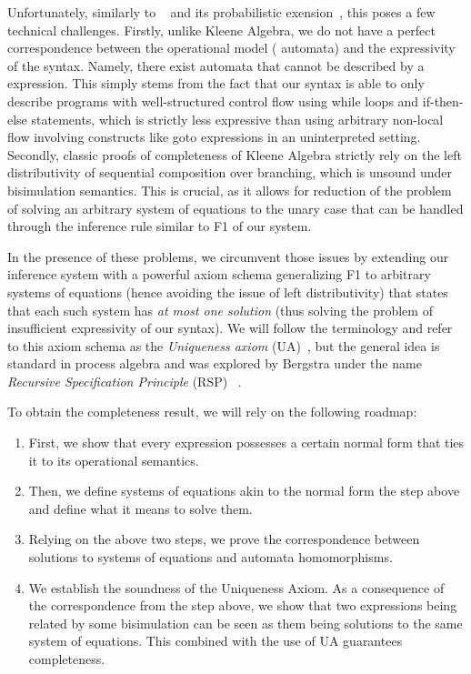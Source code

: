 \documentclass[a4paper,UKenglish,cleveref, autoref, thm-restate]{lipics-v2021}
\newcommand{\wgkat}{\textsf{\upshape{wGKAT}}\xspace}
\newcommand{\gkat}{\textsf{\upshape{GKAT}}\xspace}
\theoremstyle{plain}\newtheoremrep{thm}{Theorem}[section]
\begin{document}
	Unfortunately, similarly to \gkat~\cite{Smolka_2019} and its probabilistic exension~\cite{rozowski2023probabilistic}, this poses a few technical challenges. Firstly, unlike Kleene Algebra, we do not have a perfect correspondence between the operational model (\wgkat automata) and the expressivity of the syntax. Namely, there exist \wgkat automata that cannot be described by a \wgkat expression. This simply stems from the fact that our syntax is able to only describe programs with well-structured control flow using while loops and if-then-else statements, which is strictly less expressive than using arbitrary non-local flow involving constructs like goto expressions in an uninterpreted setting.
	Secondly,  classic proofs of completeness of Kleene Algebra strictly rely on the left distributivity of sequential composition over branching, which is unsound under bisimulation semantics. This is crucial, as it allows for reduction of the problem of solving an arbitrary system of equations to the unary case that can be handled through the inference rule similar to \textsf{F1} of our system. 
	
	In the presence of these problems, we circumvent those issues by extending our inference system with a powerful axiom schema generalizing \textsf{F1} to arbitrary systems of equations (hence avoiding the issue of left distributivity) that states that each such system has \emph{at most one solution} (thus solving the problem of insufficient expressivity of our syntax). We will follow the \gkat terminology and refer to this axiom schema as the \emph{Uniqueness axiom} \textsf{(UA)}~\cite{Smolka_2019}, but the general idea is standard in process algebra and was explored by Bergstra under the name \emph{Recursive Specification Principle} \textsf{(RSP)}~ \cite{10.1007/3-540-16444-8_1}.  
	
	To obtain the completeness result, we will rely on the following roadmap:
	\begin{enumerate}
		\item First, we show that every \wgkat expression possesses a certain normal form that ties it to its operational semantics.
		\item Then, we define systems of equations akin to the normal form the step above and define what it means to solve them.
		\item Relying on the above two steps, we prove the correspondence between solutions to systems of equations and \wgkat automata homomorphisms.
		\item We establish the soundness of the Uniqueness Axiom. As a consequence of the correspondence from the step above, we show that two expressions being related by some bisimulation can be seen as them being solutions to the same system of equations. This combined with the use of \textsf{UA} guarantees completeness. 
	\end{enumerate} 
	 
\end{document}
